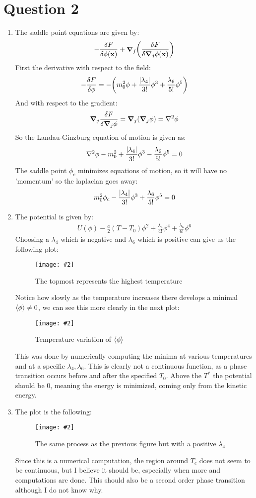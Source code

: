 \documentclass[12pt]{article}
\newcommand{\fig}[3]
{
  \begin{figure}[H]
    \centering
    \texttt{[image: \#2]}
    \caption{#3}
  \end{figure}
}
\begin{document}
\section*{Question 2}
\begin{enumerate}
\item The saddle point equations are given by:
  \begin{align*}
    -\fdv{F}{\phi(\vb{x})}+\grad_j\qty(\fdv{F}{\grad_j\phi(\vb{x})})
  \end{align*}
  First the derivative with respect to the field:
  \begin{align*}
    -\fdv{F}{\phi}=-\qty(m_0^2\phi
    +\frac{\abs{\lambda_4}}{3!}\phi^3
    +\frac{\lambda_6}{5!}\phi^5)
  \end{align*}
  And with respect to the gradient:
  \begin{align*}
    \grad_j\fdv{F}{\grad_j\phi}=\grad_j\qty(\grad_j\phi)=\laplacian{\phi}
  \end{align*}
  So the Landau-Ginzburg equation of motion is given as:
  \begin{align*}
    \laplacian{\phi}-m_0^2+\frac{\abs{\lambda_4}}{3!}\phi^3
    -\frac{\lambda_6}{5!}\phi^5=0
  \end{align*}
  The saddle point $\phi_c$ minimizes equations of motion, so it will have no 'momentum' so the laplacian goes away:
  \begin{align*}
    m_0^2\phi_c-\frac{\abs{\lambda_4}}{3!}\phi^3+\frac{\lambda_6}{5!}\phi^5=0
  \end{align*}
\item The potential is given by:
  \begin{align*}
    U(\phi)-\frac{a}{2}(T-T_0)\phi^2+\frac{\lambda_4}{4!}\phi^4
    +\frac{\lambda_6}{6!}\phi^6
  \end{align*}
  Choosing a $\lambda_4$ which is negative and $\lambda_6$ which is positive can give us the following plot:
  \fig{9.0}{potentialhw1}{The topmost represents the highest temperature}
  Notice how slowly as the temperature increases there develops a minimal $\ev{\phi}\neq0$, we can see this more clearly in the next plot:
  \fig{9.0}{tempvariation}{Temperature variation of $\ev{\phi}$}
  This was done by numerically computing the minima at various temperatures and at a specific $\lambda_4,\lambda_6$. This is clearly not a continuous function, as a phase transition occurs before and after the specified $T_0$. Above the $T^*$ the potential should be $0$, meaning the energy is minimized, coming only from the kinetic energy.
\item The plot is the following:
  \fig{9.0}{plusl4}{The same process as the previous figure but with a positive $\lambda_4$}
  Since this is a numerical computation, the region around $T_c$ does not seem to be continuous, but I believe it should be, especially when more and computations are done. This should also be a second order phase transition although I do not know why. 
\end{enumerate}
\end{document}
